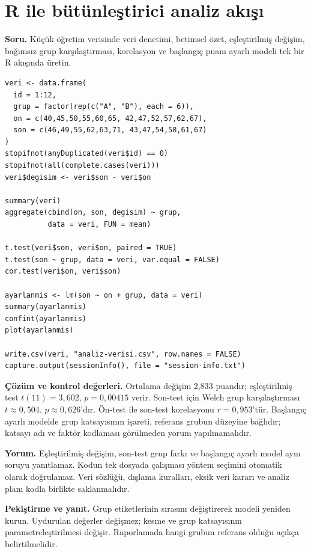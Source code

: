 \section{R ile bütünleştirici analiz akışı}
\label{sec:r-integrated-lab}

\textbf{Soru.} Küçük öğretim verisinde veri denetimi, betimsel özet,
eşleştirilmiş değişim, bağımsız grup karşılaştırması, korelasyon ve başlangıç
puanı ayarlı modeli tek bir R akışında üretin.

\begin{lstlisting}[style=prismR]
veri <- data.frame(
  id = 1:12,
  grup = factor(rep(c("A", "B"), each = 6)),
  on = c(40,45,50,55,60,65, 42,47,52,57,62,67),
  son = c(46,49,55,62,63,71, 43,47,54,58,61,67)
)
stopifnot(anyDuplicated(veri$id) == 0)
stopifnot(all(complete.cases(veri)))
veri$degisim <- veri$son - veri$on

summary(veri)
aggregate(cbind(on, son, degisim) ~ grup,
          data = veri, FUN = mean)

t.test(veri$son, veri$on, paired = TRUE)
t.test(son ~ grup, data = veri, var.equal = FALSE)
cor.test(veri$on, veri$son)

ayarlanmis <- lm(son ~ on + grup, data = veri)
summary(ayarlanmis)
confint(ayarlanmis)
plot(ayarlanmis)

write.csv(veri, "analiz-verisi.csv", row.names = FALSE)
capture.output(sessionInfo(), file = "session-info.txt")
\end{lstlisting}

\begin{outputguidebox}
\textbf{Çözüm ve kontrol değerleri.} Ortalama değişim 2,833 puandır;
eşleştirilmiş test $t(11)=3{,}602$, $p=0{,}00415$ verir. Son-test için
Welch grup karşılaştırması $t\approx0{,}504$, $p\approx0{,}626$'dır.
Ön-test ile son-test korelasyonu $r=0{,}953$'tür. Başlangıç ayarlı modelde
grup katsayısının işareti, referans grubun düzeyine bağlıdır; katsayı adı ve
faktör kodlaması görülmeden yorum yapılmamalıdır.
\end{outputguidebox}

\textbf{Yorum.} Eşleştirilmiş değişim, son-test grup farkı ve başlangıç ayarlı
model aynı soruyu yanıtlamaz. Kodun tek dosyada çalışması yöntem seçimini
otomatik olarak doğrulamaz. Veri sözlüğü, dışlama kuralları, eksik veri kararı
ve analiz planı kodla birlikte saklanmalıdır.

\textbf{Pekiştirme ve yanıt.} Grup etiketlerinin sırasını değiştirerek modeli
yeniden kurun. Uydurulan değerler değişmez; kesme ve grup katsayısının
parametreleştirilmesi değişir. Raporlamada hangi grubun referans olduğu açıkça
belirtilmelidir.